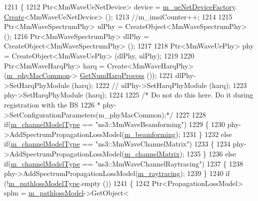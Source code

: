 \begin{DoxyCode}
1211 \{
1212         Ptr<MmWaveUeNetDevice> device = \hyperlink{classns3_1_1MmWaveHelper_aac0d84004f3793855cccd64f0c42ff34}{m\_ueNetDeviceFactory}.
      \hyperlink{classns3_1_1ObjectFactory_a18152e93f0a6fe184ed7300cb31e9896}{Create}<MmWaveUeNetDevice> ();
1213         \textcolor{comment}{//m\_imsiCounter++;}
1214 
1215         Ptr<MmWaveSpectrumPhy> ulPhy = CreateObject<MmWaveSpectrumPhy> ();
1216         Ptr<MmWaveSpectrumPhy> dlPhy = CreateObject<MmWaveSpectrumPhy> ();
1217 
1218         Ptr<MmWaveUePhy> phy = CreateObject<MmWaveUePhy> (dlPhy, ulPhy);
1219 
1220         Ptr<MmWaveHarqPhy> harq = Create<MmWaveHarqPhy> (\hyperlink{classns3_1_1MmWaveHelper_a6aaa35de743b9a88998de0128b1046b4}{m\_phyMacCommon}->
      \hyperlink{classns3_1_1MmWavePhyMacCommon_a40773d84172ebeb5aff125f56ebcc5ac}{GetNumHarqProcess} ());
1221         dlPhy->SetHarqPhyModule (harq);
1222 \textcolor{comment}{//      ulPhy->SetHarqPhyModule (harq);}
1223         phy->SetHarqPhyModule (harq);
1224 
1225         \textcolor{comment}{/* Do not do this here. Do it during registration with the BS}
1226 \textcolor{comment}{         * phy->SetConfigurationParameters(m\_phyMacCommon);*/}
1227 
1228         \textcolor{keywordflow}{if}(\hyperlink{classns3_1_1MmWaveHelper_aec88d691230f0db9448a7f953301bb24}{m\_channelModelType} == \textcolor{stringliteral}{"ns3::MmWaveBeamforming"})
1229         \{
1230                 phy->AddSpectrumPropagationLossModel(\hyperlink{classns3_1_1MmWaveHelper_a4fa071b6d755f32a684906150660b381}{m\_beamforming});
1231         \}
1232         \textcolor{keywordflow}{else} \textcolor{keywordflow}{if}(\hyperlink{classns3_1_1MmWaveHelper_aec88d691230f0db9448a7f953301bb24}{m\_channelModelType} == \textcolor{stringliteral}{"ns3::MmWaveChannelMatrix"})
1233         \{
1234                 phy->AddSpectrumPropagationLossModel(\hyperlink{classns3_1_1MmWaveHelper_a731a9e28a12edacd78b96800025db070}{m\_channelMatrix});
1235         \}
1236         \textcolor{keywordflow}{else} \textcolor{keywordflow}{if}(\hyperlink{classns3_1_1MmWaveHelper_aec88d691230f0db9448a7f953301bb24}{m\_channelModelType} == \textcolor{stringliteral}{"ns3::MmWaveChannelRaytracing"})
1237         \{
1238                 phy->AddSpectrumPropagationLossModel(\hyperlink{classns3_1_1MmWaveHelper_a99e1ebbb84d122ea60a9fe7c1bb44528}{m\_raytracing});
1239         \}
1240         \textcolor{keywordflow}{if} (!\hyperlink{classns3_1_1MmWaveHelper_a7f17e9bc4797b51d9a31d16c7e667960}{m\_pathlossModelType}.empty ())
1241         \{
1242                 Ptr<PropagationLossModel> splm = \hyperlink{classns3_1_1MmWaveHelper_a4de60027f5a256fe51033e6d6803e9b0}{m\_pathlossModel}->GetObject<

\end{DoxyCode}
